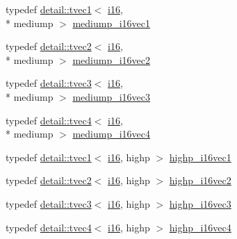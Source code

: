 \begin{DoxyCompactItemize}
\item 
typedef \hyperlink{structglm_1_1detail_1_1tvec1}{detail\-::tvec1}$<$ \hyperlink{group__gtc__type__precision_ga35e5542ca05b29cc256fdafb8503d1fd}{i16}, \\*
mediump $>$ \hyperlink{group__gtc__type__precision_ga6a1d37139ea8990de24edf4bfa3500ad}{mediump\-\_\-i16vec1}
\item 
typedef \hyperlink{structglm_1_1detail_1_1tvec2}{detail\-::tvec2}$<$ \hyperlink{group__gtc__type__precision_ga35e5542ca05b29cc256fdafb8503d1fd}{i16}, \\*
mediump $>$ \hyperlink{group__gtc__type__precision_ga664a0266910df3c2d6559651f94d32e6}{mediump\-\_\-i16vec2}
\item 
typedef \hyperlink{structglm_1_1detail_1_1tvec3}{detail\-::tvec3}$<$ \hyperlink{group__gtc__type__precision_ga35e5542ca05b29cc256fdafb8503d1fd}{i16}, \\*
mediump $>$ \hyperlink{group__gtc__type__precision_gad9e470f707da812fe454505c99035471}{mediump\-\_\-i16vec3}
\item 
typedef \hyperlink{structglm_1_1detail_1_1tvec4}{detail\-::tvec4}$<$ \hyperlink{group__gtc__type__precision_ga35e5542ca05b29cc256fdafb8503d1fd}{i16}, \\*
mediump $>$ \hyperlink{group__gtc__type__precision_gad9aca299fc3e96c84be6b063381c9f3e}{mediump\-\_\-i16vec4}
\item 
typedef \hyperlink{structglm_1_1detail_1_1tvec1}{detail\-::tvec1}$<$ \hyperlink{group__gtc__type__precision_ga35e5542ca05b29cc256fdafb8503d1fd}{i16}, highp $>$ \hyperlink{group__gtc__type__precision_ga0ed3103e2d3acb4efbe313add4243a72}{highp\-\_\-i16vec1}
\item 
typedef \hyperlink{structglm_1_1detail_1_1tvec2}{detail\-::tvec2}$<$ \hyperlink{group__gtc__type__precision_ga35e5542ca05b29cc256fdafb8503d1fd}{i16}, highp $>$ \hyperlink{group__gtc__type__precision_ga74df9e215c049f82d277473c4c974bb4}{highp\-\_\-i16vec2}
\item 
typedef \hyperlink{structglm_1_1detail_1_1tvec3}{detail\-::tvec3}$<$ \hyperlink{group__gtc__type__precision_ga35e5542ca05b29cc256fdafb8503d1fd}{i16}, highp $>$ \hyperlink{group__gtc__type__precision_ga8dcfd412bd9ce99a1cf5c2b6e50f07e7}{highp\-\_\-i16vec3}
\item 
typedef \hyperlink{structglm_1_1detail_1_1tvec4}{detail\-::tvec4}$<$ \hyperlink{group__gtc__type__precision_ga35e5542ca05b29cc256fdafb8503d1fd}{i16}, highp $>$ \hyperlink{group__gtc__type__precision_ga7fd6f1b3c224833cc330a2c64b6994dd}{highp\-\_\-i16vec4}

\end{DoxyCompactItemize}
